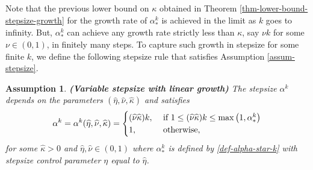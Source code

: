 \documentclass[final,numbook]{svjour3}
\newtheorem{assumption}[property]{Assumption}
\begin{document}
Note that the previous lower bound on $\kappa$ obtained in Theorem \ref{thm-lower-bound-stepsize-growth} for the growth rate of $\alpha_*^k$ is achieved in the limit as $k$ goes to infinity. But, $\alpha_*^k$ can achieve any growth rate strictly less than $\kappa$, say $\nu k$ for some $\nu \in (0,1)$, in finitely many steps. To capture such growth in stepsize for some finite $k$, we define the following stepsize rule that satisfies Assumption \ref{assum-stepsize}. 
\noindent \begin{assumption}\label{assum-stepsize-simple-with-lin-conv} \textbf{(Variable stepsize with linear growth)} The stepsize $\alpha^k$ depends on the parameters $(\widehat\eta,\widehat\nu,\widehat\kappa)$ and satisfies 
\begin{eqnarray}\label{stepsize-linear-growth} \alpha^k = \alpha^k(\widehat\eta,\widehat\nu,\widehat\kappa) = 
\begin{cases} 
      (\widehat\nu \widehat\kappa) k,   \hfill & \text{ if } 1\leq (\widehat\nu \widehat\kappa) k \leq \max\big(1,\alpha_*^k \big) \\
      1, & \text{ otherwise}, 
  \end{cases}
\end{eqnarray}  
for some $\widehat\kappa > 0$ and $\widehat\eta,\widehat\nu \in (0,1)$ where $\alpha_*^k$ is defined by \eqref{def-alpha-star-k} with stepsize control parameter $\eta$ equal to $\widehat{\eta}$.
\end{assumption} 
\end{document}
